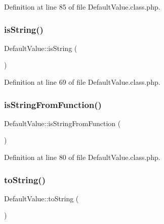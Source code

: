 Definition at line 85 of file Default\+Value.\+class.\+php.

\mbox{\label{classDefaultValue_a2ff17e887cf955aea26fbb1b3e11f491}} 
\subsubsection{\texorpdfstring{is\+String()}{isString()}}
{\footnotesize\ttfamily Default\+Value\+::is\+String (\begin{DoxyParamCaption}{ }\end{DoxyParamCaption})}



Definition at line 69 of file Default\+Value.\+class.\+php.

\mbox{\label{classDefaultValue_aeef8c65be1e3cfe7459916653d6d9181}} 
\subsubsection{\texorpdfstring{is\+String\+From\+Function()}{isStringFromFunction()}}
{\footnotesize\ttfamily Default\+Value\+::is\+String\+From\+Function (\begin{DoxyParamCaption}{ }\end{DoxyParamCaption})}



Definition at line 80 of file Default\+Value.\+class.\+php.

\mbox{\label{classDefaultValue_a0f0d4d1cc64b3bfb8d2acec2b113be4d}} 
\subsubsection{\texorpdfstring{to\+String()}{toString()}}
{\footnotesize\ttfamily Default\+Value\+::to\+String (\begin{DoxyParamCaption}{ }\end{DoxyParamCaption})}



